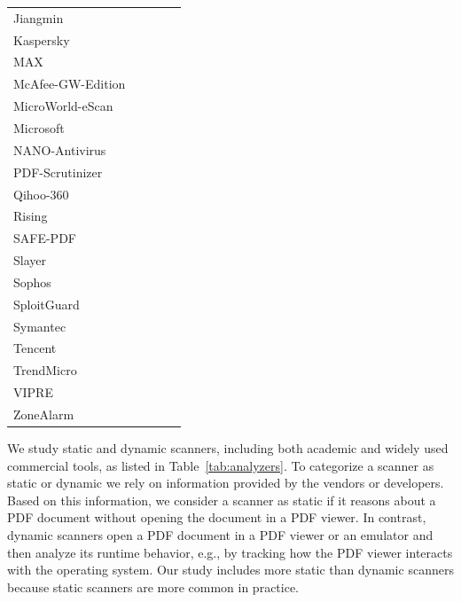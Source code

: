 \begin{table}[tb]
\begin{tabular}{@{}lcccc@{}}
		Jiangmin & \cmark & & & \cmark \\
		Kaspersky & \cmark & & & \cmark \\
		MAX & \cmark & & & \cmark \\
		McAfee-GW-Edition & \cmark & & & \cmark \\
		MicroWorld-eScan & \cmark & & & \cmark \\
		Microsoft & \cmark & & & \cmark \\
		NANO-Antivirus & \cmark & & & \cmark \\
		PDF-Scrutinizer~\cite{schmitt2012pdf} & & \cmark & \cmark & \\
		Qihoo-360 & \cmark & & & \cmark \\
		Rising & \cmark & & & \cmark \\
		SAFE-PDF~\cite{2018arXiv181012490J} & \cmark & & \cmark & \\
		Slayer~\cite{maiorca2012pattern} & \cmark & & \cmark & \\
		Sophos & \cmark & & & \cmark \\
		SploitGuard & & \cmark & & \cmark \\
		Symantec & \cmark & & & \cmark \\
		Tencent & \cmark & & & \cmark \\
		TrendMicro & \cmark & & & \cmark \\
		VIPRE & \cmark & & & \cmark \\
		ZoneAlarm & \cmark & & & \cmark \\
		\bottomrule
	\end{tabular}
\end{table}

We study \nbStaticAnalyzers{} static and \nbDynamicAnalyzers{} dynamic scanners, including both academic and widely used commercial tools, as listed in Table~\ref{tab:analyzers}.
To categorize a scanner as static or dynamic we rely on information provided 
by the vendors or developers.
Based on this information, we consider a scanner as static if it reasons 
about a PDF document without opening the document in a PDF viewer.
In contrast, dynamic scanners open a PDF document in a PDF viewer or an emulator and then 
analyze its runtime behavior, e.g., by tracking how the PDF viewer interacts 
with the operating system.
Our study includes more static than dynamic scanners because static scanners are more common in practice.

